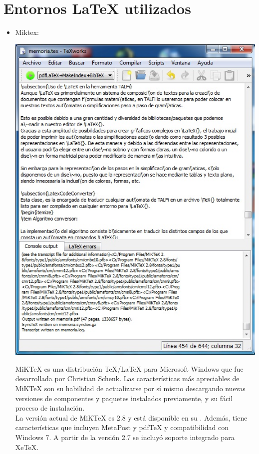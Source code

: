 \documentclass[12pt,a4paper,spanish]{book}
\begin{document}
\section{Entornos \LaTeX{} utilizados}
\begin{itemize}
\item Miktex:
\begin{center}
\includegraphics[scale=0.7]{prog1.jpg}
\end{center}
MiKTeX es una distribuci\'on \TeX{}/\LaTeX{} para Microsoft Windows que fue desarrollada por Christian Schenk.
Las caracter\'isticas m\'as apreciables de MiKTeX son su habilidad de actualizarse por s\'i mismo descargando nuevas versiones de componentes y paquetes instalados previamente, y su f\'acil proceso de instalaci\'on.\\
La versi\'on actual de MiKTeX es 2.8 y est\'a disponible en su . Adem\'as, tiene caracter\'isticas que incluyen MetaPost y pdfTeX y compatibilidad con Windows 7. A partir de la versi\'on 2.7 se incluy\'o soporte integrado para XeTeX.
\newline \newline \newline \newline


\end{itemize}
\end{document}
